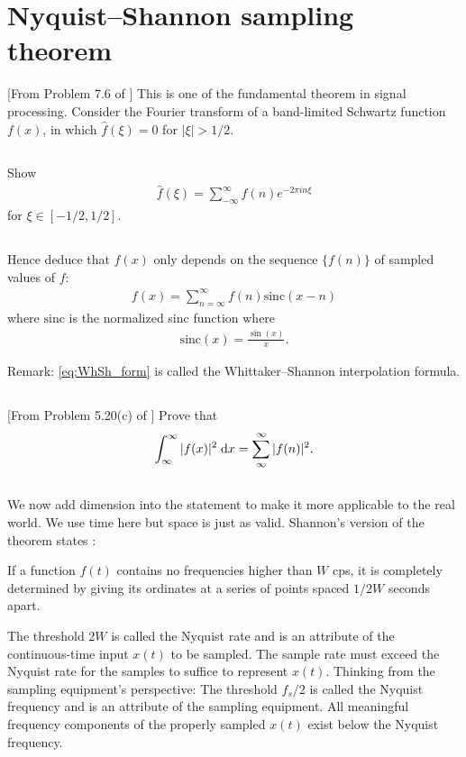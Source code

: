 \documentclass[11pt,letterpaper]{report}
\begin{document}
\section{Nyquist–Shannon sampling theorem}
[From Problem 7.6 of \cite{ShearerLevy_15}] This is one of the fundamental theorem in signal processing. Consider the Fourier transform of a band-limited Schwartz function $f(x)$, in which $\hat f(\xi) = 0$ for $|\xi|>1/2$. 

\subsection{}
Show
\begin{align}
    \hat{f}(\xi)=\sum_{-\infty}^\infty f(n)e^{-2\pi in \xi}
\end{align}
for $\xi\in [-1/2, 1/2]$. 

\subsection{}
Hence deduce that $f(x)$ only depends on the sequence $\{f(n)\}$ of sampled values of $f$:
\begin{align}
    f(x) = \sum_{n=\infty}^\infty f(n) \text{sinc}(x-n)\label{eq:WhSh_form}
\end{align}
where $\text{sinc}$ is the normalized sinc function where
\begin{align}
    \text{sinc}(x) = \frac{\sin(x)}{x}.
\end{align}

Remark: \eqref{eq:WhSh_form} is called the Whittaker–Shannon interpolation formula.

\subsection{}
[From Problem 5.20(c) of \cite{SteinShakarchi_03}] Prove that
\begin{align}
    \int_\infty ^\infty |f(x)|^2\;\mathrm{d} x = \sum_\infty ^\infty |f(n)|^2.
\end{align}

\subsection{}
We now add dimension into the statement to make it more applicable to the real world. We use time here but space is just as valid. Shannon's version of the theorem states \parencite{Shannon_49}:
\begin{displayquote}
    If a function $f(t)$ contains no frequencies higher than $W$ cps, it is completely determined by giving its ordinates at a series of points spaced $1/2W$ seconds apart.
\end{displayquote}
The threshold $2W$ is called the Nyquist rate and is an attribute of the continuous-time input $x(t)$ to be sampled. The sample rate must exceed the Nyquist rate for the samples to suffice to represent $x(t)$. Thinking from the sampling equipment's perspective: The threshold $f_{s}/2$ is called the Nyquist frequency and is an attribute of the sampling equipment. All meaningful frequency components of the properly sampled $x(t)$ exist below the Nyquist frequency. 
\end{document}
